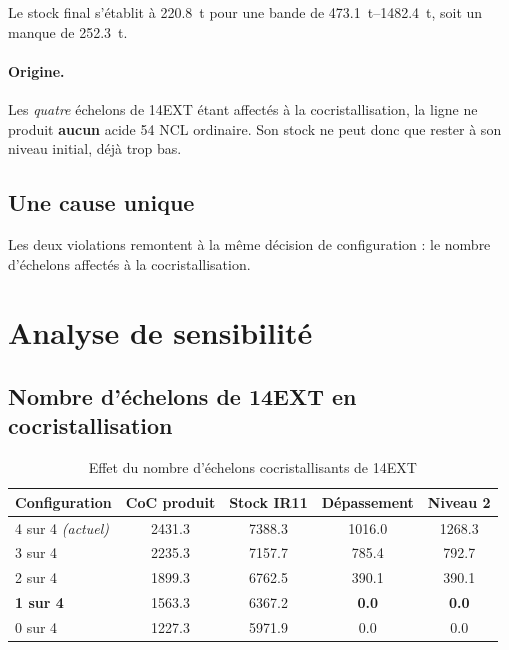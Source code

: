 Le stock final s'établit à \SI{220,8}{\tonne} pour une bande de
\SIrange{473,1}{1482,4}{\tonne}, soit un manque de \SI{252,3}{\tonne}.

\paragraph{Origine.} Les \emph{quatre} échelons de 14EXT étant affectés à la
cocristallisation, la ligne ne produit \textbf{aucun} acide 54 NCL ordinaire. Son stock ne
peut donc que rester à son niveau initial, déjà trop bas.

\subsection{Une cause unique}

Les deux violations remontent à la même décision de configuration : le nombre d'échelons
affectés à la cocristallisation.

\section{Analyse de sensibilité}

\subsection{Nombre d'échelons de 14EXT en cocristallisation}

\begin{table}[H]
\centering
\caption{Effet du nombre d'échelons cocristallisants de 14EXT}
\label{tab:sensib-coc}
\begin{tabular}{@{}lS[table-format=4.1]S[table-format=4.1]S[table-format=4.1]S[table-format=4.1]@{}}
\toprule
\textbf{Configuration} & {\textbf{CoC produit}} & {\textbf{Stock IR11}} & {\textbf{Dépassement}} & {\textbf{Niveau 2}} \\
 sur 4 \emph{(actuel)} & 2431.3 & 7388.3 & 1016.0 & 1268.3 \\
3 sur 4 & 2235.3 & 7157.7 & 785.4 & 792.7 \\
2 sur 4 & 1899.3 & 6762.5 & 390.1 & 390.1 \\
\textbf{1 sur 4} & 1563.3 & 6367.2 & \bfseries 0.0 & \bfseries 0.0 \\
0 sur 4 & 1227.3 & 5971.9 & 0.0 & 0.0 \\
\bottomrule
\end{tabular}
\end{table}

